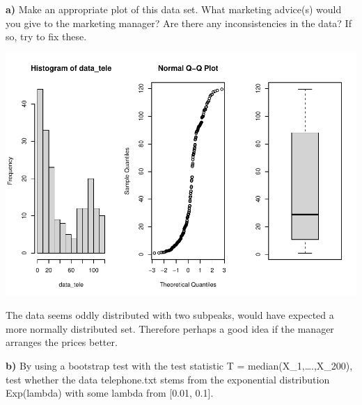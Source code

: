 \documentclass[
]{article}
\newenvironment{Shaded}{\begin{snugshade}}{\end{snugshade}}
\newcommand{\AttributeTok}[1]{\textcolor[rgb]{0.77,0.63,0.00}{#1}}
\newcommand{\ConstantTok}[1]{\textcolor[rgb]{0.00,0.00,0.00}{#1}}
\newcommand{\DecValTok}[1]{\textcolor[rgb]{0.00,0.00,0.81}{#1}}
\newcommand{\FunctionTok}[1]{\textcolor[rgb]{0.00,0.00,0.00}{#1}}
\newcommand{\NormalTok}[1]{#1}
\newcommand{\OtherTok}[1]{\textcolor[rgb]{0.56,0.35,0.01}{#1}}
\newcommand{\SpecialCharTok}[1]{\textcolor[rgb]{0.00,0.00,0.00}{#1}}
\newcommand{\StringTok}[1]{\textcolor[rgb]{0.31,0.60,0.02}{#1}}
\begin{document}
\textbf{a)} Make an appropriate plot of this data set. What marketing
advice(s) would you give to the marketing manager? Are there any
inconsistencies in the data? If so, try to fix these.

\begin{Shaded}
\end{Shaded}

\includegraphics{Assignment-1_files/figure-latex/unnamed-chunk-7-1.pdf}

The data seems oddly distributed with two subpeaks, would have expected
a more normally distributed set. Therefore perhaps a good idea if the
manager arranges the prices better.

\textbf{b)} By using a bootstrap test with the test statistic T =
median(X\_1,\ldots.,X\_200), test whether the data telephone.txt stems
from the exponential distribution Exp(lambda) with some lambda from
{[}0.01, 0.1{]}.
\end{document}
